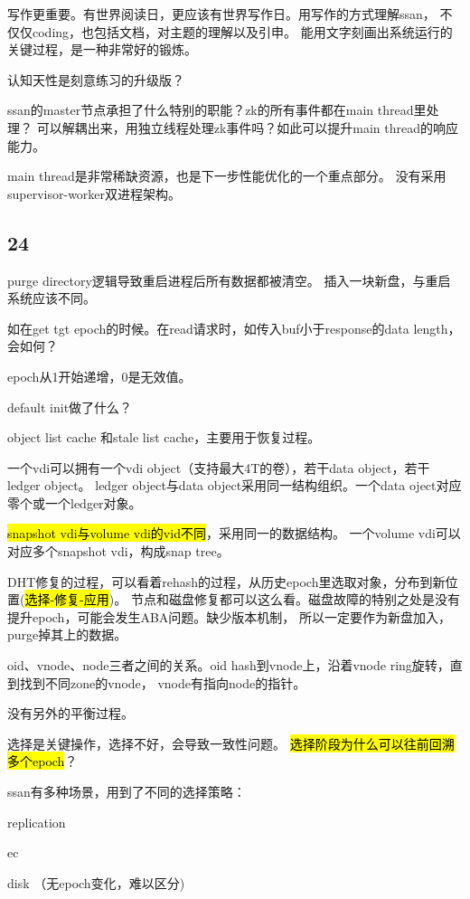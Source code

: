 写作更重要。有世界阅读日，更应该有世界写作日。用写作的方式理解ssan，
不仅仅coding，也包括文档，对主题的理解以及引申。
能用文字刻画出系统运行的关键过程，是一种非常好的锻炼。

认知天性是刻意练习的升级版？

ssan的master节点承担了什么特别的职能？zk的所有事件都在main thread里处理？
可以解耦出来，用独立线程处理zk事件吗？如此可以提升main thread的响应能力。

main thread是非常稀缺资源，也是下一步性能优化的一个重点部分。
没有采用supervisor-worker双进程架构。

\subsection{24}

purge directory逻辑导致重启进程后所有数据都被清空。
插入一块新盘，与重启系统应该不同。

如在get tgt epoch的时候。在read请求时，如传入buf小于response的data length，会如何？

epoch从1开始递增，0是无效值。

default init做了什么？

object list cache 和stale list cache，主要用于恢复过程。

\hrulefill

一个vdi可以拥有一个vdi object（支持最大4T的卷），若干data object，若干ledger object。
ledger object与data object采用同一结构组织。一个data oject对应零个或一个ledger对象。

\hl{snapshot vdi与volume vdi的vid不同}，采用同一的数据结构。
一个volume vdi可以对应多个snapshot vdi，构成snap tree。

DHT修复的过程，可以看着rehash的过程，从历史epoch里选取对象，分布到新位置(\hl{选择-修复-应用})。
节点和磁盘修复都可以这么看。磁盘故障的特别之处是没有提升epoch，可能会发生ABA问题。缺少版本机制，
所以一定要作为新盘加入，purge掉其上的数据。

oid、vnode、node三者之间的关系。oid hash到vnode上，沿着vnode ring旋转，直到找到不同zone的vnode，
vnode有指向node的指针。

没有另外的平衡过程。

选择是关键操作，选择不好，会导致一致性问题。
\hl{选择阶段为什么可以往前回溯多个epoch}？

ssan有多种场景，用到了不同的选择策略：
\begin{enumbox}
\item replication
\item ec
\item disk （无epoch变化，难以区分)
\end{enumbox}

